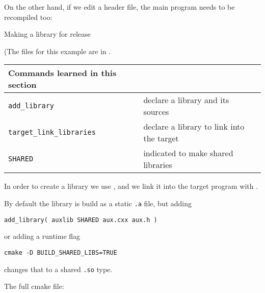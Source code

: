On the other hand, if we edit a header file, the main program
needs to be recompiled too:
%


 {Making a library for release}
\label{sec:cmake-public-lib}

(The files for this example are in .

\begin{tabular}{lp{3in}}
  \toprule
  Commands learned in this section\\
  \midrule
  \lstinline+add_library+&declare a library and its sources\\
  \lstinline+target_link_libraries+&declare a library to link into the target\\
  \lstinline+SHARED+&indicated to make shared libraries\\
  \bottomrule
\end{tabular}

\begin{floatingfigure}[r]{2.5in}
  \begin{minipage}{2.5in}
  \end{minipage}
\end{floatingfigure}
%
In order to create a library we use ,
and we link it into the target program with .

By default the library is build as a static \texttt{.a} file,
but adding
\begin{lstlisting}
add_library( auxlib SHARED aux.cxx aux.h )
\end{lstlisting}
or adding a runtime flag
\begin{verbatim}
cmake -D BUILD_SHARED_LIBS=TRUE
\end{verbatim}
changes that to a shared \texttt{.so} type.

The full cmake file:
%


